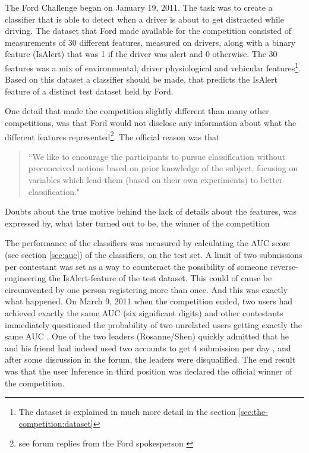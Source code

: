 The Ford Challenge began on January 19, 2011. The task was to create a classifier that is able to detect when a driver is about to get distracted while driving. The dataset that Ford made available for the competition consisted of measurements of 30 different features, measured on drivers, along with a binary feature (IsAlert) that was 1 if the driver was alert and 0 otherwise. The 30 features was a mix of environmental, driver physiological and vehicular features\footnote{The dataset is explained in much more detail in the section \ref{sec:the-competition:dataset}}. Based on this dataset a classifier should be made, that predicts the IsAlert feature of a distinct test dataset held by Ford. \par
One detail that made the competition slightly different than many other competitions, was that Ford would not disclose any information about what the different features represented\footnote{see forum replies from the Ford spokesperson \citep{kaggle_forum_266,kaggle_forum_317}}. The official reason was that 
\begin{quote}
    ``We like to encourage the participants to pursue classification without preconceived notions based on prior knowledge of the subject, focusing on variables which lead them (based on their own experiments) to better classification." \citep{kaggle_forum_268_reply_2}
\end{quote}
Doubts about the true motive behind the lack of details about the features, was expressed by, what later turned out to be, the winner of the competition \citep{kaggle_forum_295_reply_3} \par

The performance of the classifiers was measured by calculating the AUC score (see section \ref{sec:auc}) of the classifiers, on the test set. A limit of two submissions per contestant was set as a way to counteract the possibility of someone reverse-engineering the IsAlert-feature of the test dataset. This could of cause be circumvented by one person registering more than once. And this was exactly what happened. On March 9, 2011 when the competition ended, two users had achieved exactly the same AUC (six significant digits) and other contestants immediately questioned the probability of two unrelated users getting exactly the same AUC \citep{kaggle_forum_327_reply_1}. One of the two leaders (Rosanne/Shen) quickly admitted that he and his friend had indeed used two accounts to get 4 submission per day \citep{kaggle_forum_327_reply_4}, and after some discussion in the forum, the leaders were disqualified. The end result was that the user Inference in third position was declared the official winner of the competition. \par

